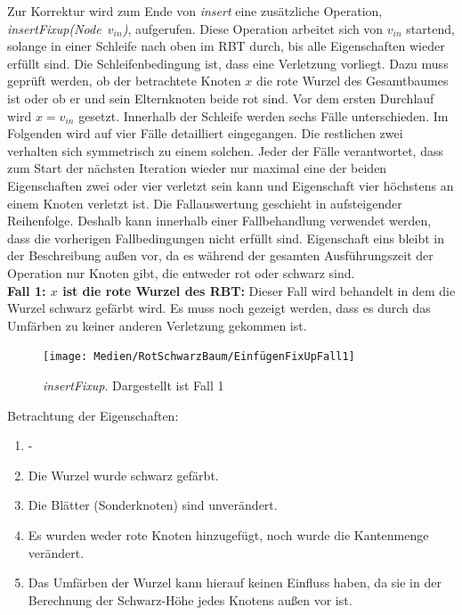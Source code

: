 \documentclass[a4paper,12pt]{article}
\begin{document}
\noindent Zur Korrektur wird zum Ende von \textit{insert} eine zusätzliche Operation,\\  \mbox{\textit{insertFixup(Node $v_{in}$)}}, aufgerufen. Diese Operation arbeitet sich von $v_{in}$ startend, solange in einer Schleife nach oben im RBT durch, bis alle Eigenschaften wieder erfüllt sind. Die Schleifenbedingung ist, dass eine Verletzung vorliegt. Dazu muss geprüft werden, ob der betrachtete Knoten $x$ die rote Wurzel des Gesamtbaumes ist oder ob er und sein Elternknoten beide rot sind. Vor dem ersten Durchlauf wird $x = v_{in}$ gesetzt. Innerhalb der Schleife werden sechs Fälle unterschieden. Im Folgenden wird auf vier Fälle detailliert eingegangen. Die restlichen zwei verhalten sich symmetrisch zu einem solchen. Jeder der Fälle verantwortet, dass zum Start der nächsten Iteration wieder nur maximal eine der beiden Eigenschaften zwei oder vier verletzt sein kann und Eigenschaft vier höchstens an einem Knoten verletzt ist. Die Fallauswertung geschieht in aufsteigender Reihenfolge. Deshalb kann innerhalb einer Fallbehandlung verwendet werden, dass die vorherigen Fallbedingungen nicht erfüllt sind. Eigenschaft eins bleibt in der Beschreibung außen vor, da es während der gesamten Ausführungszeit der Operation nur Knoten gibt, die entweder rot oder schwarz sind. \\

\noindent\textbf{Fall 1: $x$ ist die rote Wurzel des RBT: }
Dieser Fall wird behandelt in dem die Wurzel schwarz gefärbt wird. Es muss noch gezeigt werden, dass es durch das Umfärben zu keiner anderen Verletzung gekommen ist.\\
\begin{figure}[H]
	\centering
	\texttt{[image: Medien/RotSchwarzBaum/EinfügenFixUpFall1]}
	\caption{\textit{insertFixup}. Dargestellt ist Fall 1  }
	\label{fig:EinfügenFixUpFall1}
\end{figure}

Betrachtung der Eigenschaften:
\begin{enumerate}
	\item -
	\item Die Wurzel wurde schwarz gefärbt.
	\item Die Blätter (Sonderknoten) sind unverändert.
	\item Es wurden weder rote Knoten hinzugefügt, noch wurde die Kantenmenge verändert. 
	\item Das Umfärben der Wurzel kann hierauf keinen Einfluss haben, da sie in der Berechnung der Schwarz-Höhe jedes Knotens außen vor ist.
\end{enumerate}  
\end{document}
